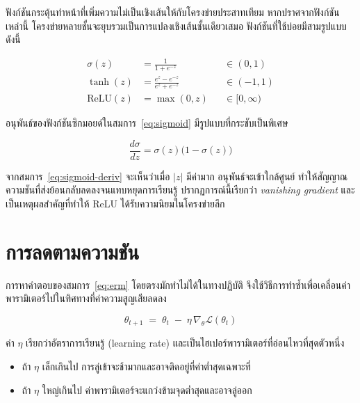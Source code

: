 \documentclass[12pt, a4paper]{article}
\begin{document}
ฟังก์ชันกระตุ้นทำหน้าที่เพิ่มความไม่เป็นเชิงเส้นให้กับโครงข่ายประสาทเทียม
หากปราศจากฟังก์ชันเหล่านี้ โครงข่ายหลายชั้นจะยุบรวมเป็นการแปลงเชิงเส้นชั้นเดียวเสมอ
ฟังก์ชันที่ใช้บ่อยมีสามรูปแบบดังนี้

\begin{align}
  \sigma(z) &= \frac{1}{1 + e^{-z}} & &\in (0,1) \label{eq:sigmoid}\\[4pt]
  \tanh(z)  &= \frac{e^{z} - e^{-z}}{e^{z} + e^{-z}} & &\in (-1,1) \label{eq:tanh}\\[4pt]
  \mathrm{ReLU}(z) &= \max(0, z) & &\in [0,\infty) \label{eq:relu}
\end{align}

อนุพันธ์ของฟังก์ชันซิกมอยด์ในสมการ~\eqref{eq:sigmoid} มีรูปแบบที่กระชับเป็นพิเศษ

\begin{equation}
  \frac{d\sigma}{dz} = \sigma(z)\bigl(1 - \sigma(z)\bigr)
  \label{eq:sigmoid-deriv}
\end{equation}

จากสมการ~\eqref{eq:sigmoid-deriv} จะเห็นว่าเมื่อ $|z|$ มีค่ามาก อนุพันธ์จะเข้าใกล้ศูนย์
ทำให้สัญญาณความชันที่ส่งย้อนกลับลดลงจนแทบหยุดการเรียนรู้ ปรากฏการณ์นี้เรียกว่า
\emph{vanishing gradient} และเป็นเหตุผลสำคัญที่ทำให้ ReLU ได้รับความนิยมในโครงข่ายลึก

\section{การลดตามความชัน}

การหาคำตอบของสมการ~\eqref{eq:erm} โดยตรงมักทำไม่ได้ในทางปฏิบัติ
จึงใช้วิธีการทำซ้ำเพื่อเคลื่อนค่าพารามิเตอร์ไปในทิศทางที่ค่าความสูญเสียลดลง

\begin{equation}
  \theta_{t+1} \;=\; \theta_{t} \;-\; \eta \, \nabla_{\theta} \mathcal{L}(\theta_{t})
  \label{eq:gd}
\end{equation}

ค่า $\eta$ เรียกว่าอัตราการเรียนรู้ (learning rate) และเป็นไฮเปอร์พารามิเตอร์ที่อ่อนไหวที่สุดตัวหนึ่ง

\begin{itemize}[leftmargin=2em, itemsep=0.2em]
  \item ถ้า $\eta$ เล็กเกินไป การลู่เข้าจะช้ามากและอาจติดอยู่ที่ค่าต่ำสุดเฉพาะที่
  \item ถ้า $\eta$ ใหญ่เกินไป ค่าพารามิเตอร์จะแกว่งข้ามจุดต่ำสุดและอาจลู่ออก
\end{itemize}
\end{document}
